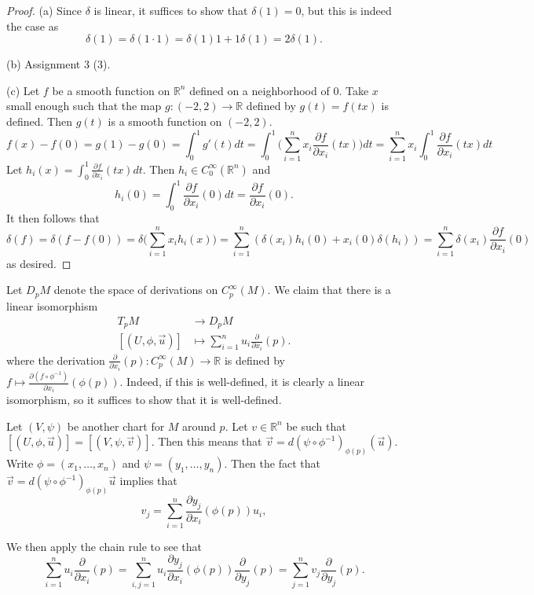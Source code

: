 \documentclass{amsart}
\numberwithin{equation}{section}
\newcommand{\bR}{\mathbb{R}}
\theoremstyle{definition}
\theoremstyle{theorem}
\begin{document}
\begin{proof}
(a) Since $\delta$ is linear, it suffices to show that $\delta(1) = 0$, but this is indeed the case as 
\[
\delta(1) = \delta(1 \cdot 1) = \delta(1)1 + 1 \delta(1) = 2 \delta(1). 
\]

\noindent
(b) Assignment 3 (3).

\noindent
(c) Let $f$ be a smooth function on $\mathbb{R}^n$ defined on a neighborhood of $0$. Take $x$ small enough such that the map 
$g : (-2,2) \to \mathbb{R}$ defined by $g(t) = f(tx)$ is defined. Then $g(t)$ is a smooth function on $(-2,2)$.  
$$
f(x) - f(0) = g(1) - g(0) 
= \int_{0}^1 g'(t)dt 
= \int_0^1 \Big( \sum_{i=1}^n x_i \frac{\partial f}{\partial x_i}(tx)\Big) dt 
= \sum_{i=1}^n x_i \int_0^1 \frac{\partial f}{\partial x_i}(tx)dt
$$ 
Let $h_i(x) = \int_0^1 \frac{\partial f}{\partial x_i}(tx)dt$. Then $h_i \in C_0^\infty(\mathbb{R}^n)$ and 
$$ 
h_i(0) = \int_0^1\frac{\partial f}{\partial x_i}(0)dt =\frac{\partial f}{\partial x_i}(0).
$$
It then follows that 
$$
\delta(f) = \delta(f - f(0)) = \delta\Big(\sum_{i=1}^n x_i h_i(x)\Big) 
= \sum_{i=1}^n (\delta(x_i) h_i(0) + x_i(0) \delta(h_i)) 
= \sum_{i=1}^n \delta(x_i) \frac{\partial f}{\partial x_i}(0)
$$
as desired.
\end{proof}


Let $D_pM$ denote the space of derivations on $C_p^\infty(M)$. We claim that there is a linear isomorphism 
\begin{align*}
T_pM &\longrightarrow D_pM \\
[(U, \phi, \vec{u})] &\mapsto \sum_{i=1}^n u_i \frac{\partial}{\partial x_i}(p).
\end{align*}
where the derivation $\frac{\partial}{\partial x_i}(p):C^\infty_p(M)\to \bR$ is defined by 
$f\mapsto \frac{\partial(f \circ \phi^{-1})}{\partial x_i}(\phi(p))$. 
Indeed, if this is well-defined, it is clearly a linear isomorphism, so it suffices to show that it is well-defined. 

Let $(V,\psi)$ be another chart for $M$ around $p$. Let $v \in \bR^n$ be such that $[(U,\phi, \vec{u})] = [(V, \psi, \vec{v})]$. 
Then this means that $\vec{v} = d(\psi \circ \phi^{-1})_{\phi(p)}(\vec{u})$. Write $\phi = (x_1, \ldots, x_n)$ and 
$\psi = (y_1, \ldots, y_n)$. Then the fact that $\vec{v} = d(\psi \circ \phi^{-1})_{\phi(p)}\vec{u}$ implies that 
\[
v_j = \sum_{i=1}^n \frac{\partial y_j}{\partial x_i} (\phi(p)) u_i,
\]


We then apply the chain rule to see that    
$$
\sum_{i=1}^n u_i \frac{\partial }{\partial x_i}(p) = \sum_{i,j=1}^n u_i \frac{\partial y_j}{\partial x_i}(\phi(p)) \frac{\partial }{\partial y_j}(p) 
= \sum_{j=1}^n v_j \frac{\partial}{\partial y_j}(p).
$$
\end{document}
